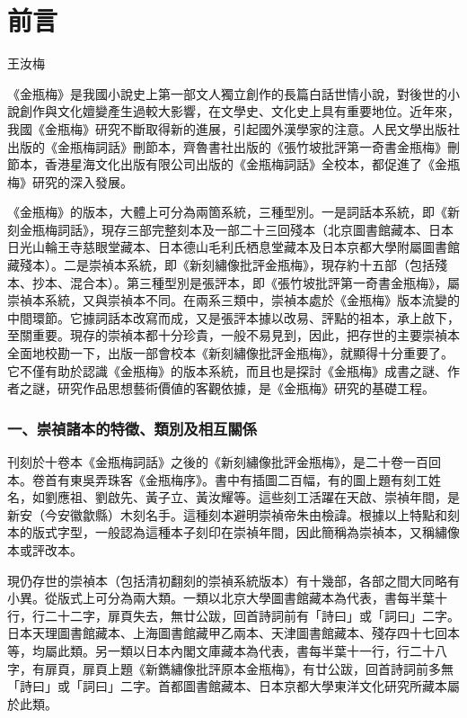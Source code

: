 \chapter*{前言}

\begin{declareqianyan}
王汝梅\qquad\ 
\end{declareqianyan}	

《金瓶梅》是我國小說史上第一部文人獨立創作的長篇白話世情小說，對後世的小說創作與文化嬗變產生過較大影響，在文學史、文化史上具有重要地位。近年來，我國《金瓶梅》研究不斷取得新的進展，引起國外漢學家的注意。人民文學出版社出版的《金瓶梅詞話》刪節本，齊魯書社出版的《張竹坡批評第一奇書金瓶梅》刪節本，香港星海文化出版有限公司出版的《金瓶梅詞話》全校本，都促進了《金瓶梅》研究的深入發展。

《金瓶梅》的版本，大體上可分為兩箇系統，三種型別。一是詞話本系統，即《新刻金瓶梅詞話》，現存三部完整刻本及一部二十三回殘本（北京圖書館藏本、日本日光山輪王寺慈眼堂藏本、日本德山毛利氏栖息堂藏本及日本京都大學附屬圖書館藏殘本）。二是崇禎本系統，即《新刻繡像批評金瓶梅》，現存約十五部（包括殘本、抄本、混合本）。第三種型別是張評本，即《張竹坡批評第一奇書金瓶梅》，屬崇禎本系統，又與崇禎本不同。在兩系三類中，崇禎本處於《金瓶梅》版本流變的中間環節。它據詞話本改寫而成，又是張評本據以改易、評點的祖本，承上啟下，至關重要。現存的崇禎本都十分珍貴，一般不易見到，因此，把存世的主要崇禎本全面地校勘一下，出版一部會校本《新刻繡像批評金瓶梅》，就顯得十分重要了。它不僅有助於認識《金瓶梅》的版本系統，而且也是探討《金瓶梅》成書之謎、作者之謎，研究作品思想藝術價値的客觀依據，是《金瓶梅》研究的基礎工程。

\subsection*{一、崇禎諸本的特徵、類別及相互關係}

刊刻於十卷本《金瓶梅詞話》之後的《新刻繡像批評金瓶梅》，是二十卷一百回本。卷首有東吳弄珠客《金瓶梅序》。書中有插圖二百幅，有的圖上題有刻工姓名，如劉應祖、劉啟先、黃子立、黃汝耀等。這些刻工活躍在天啟、崇禎年間，是新安（今安徽歙縣）木刻名手。這種刻本避明崇禎帝朱由檢諱。根據以上特點和刻本的版式字型，一般認為這種本子刻印在崇禎年間，因此簡稱為崇禎本，又稱繡像本或評改本。

現仍存世的崇禎本（包括清初翻刻的崇禎系統版本）有十幾部，各部之間大同略有小異。從版式上可分為兩大類。一類以北京大學圖書館藏本為代表，書每半葉十行，行二十二字，扉頁失去，無廿公跋，回首詩詞前有「詩曰」或「詞曰」二字。日本天理圖書館藏本、上海圖書館藏甲乙兩本、天津圖書館藏本、殘存四十七回本等，均屬此類。另一類以日本內閣文庫藏本為代表，書每半葉十一行，行二十八字，有扉頁，扉頁上題《新鐫繡像批評原本金瓶梅》，有廿公跋，回首詩詞前多無 「詩曰」或「詞曰」二字。首都圖書館藏本、日本京都大學東洋文化研究所藏本屬於此類。

